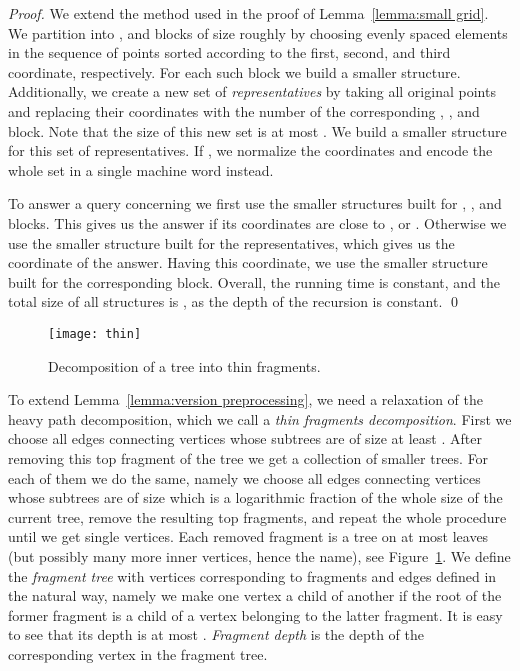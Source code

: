 \documentclass[runningheads]{llncs}
\begin{document}
\begin{proof}
We extend the method used in the proof of Lemma~\ref{lemma:small grid}. We partition  into ,  and  blocks of size roughly  by choosing  evenly spaced elements in the sequence of points sorted according to the first, second, and third coordinate, respectively. For each such block we build a smaller structure. Additionally, we create a new set of {\it representatives} by taking all original points and replacing their coordinates with the number of the corresponding , , and  block. Note that the size of this new set is at most . We build a smaller structure for this set of representatives. If , we normalize the coordinates and encode the whole set in a single machine word instead.

To answer a query concerning  we first use the smaller structures built for , , and  blocks. This gives us the answer if its coordinates are close to ,  or . Otherwise we use the smaller structure built for the representatives, which gives us the  coordinate of the answer. Having this coordinate, we use the smaller structure built for the corresponding  block. Overall, the running time is constant, and the total size of all structures is , as the depth of the recursion is constant.
\qed
\end{proof}

\begin{figure}
\centering
\texttt{[image: thin]}
\caption{Decomposition of a tree into thin fragments.}
\label{figure:thin fragments}
\end{figure}

To extend Lemma~\ref{lemma:version preprocessing}, we need a relaxation of the heavy path decomposition, which we call a {\it thin fragments decomposition}.  First we choose all edges connecting vertices whose subtrees are of size at least . After removing this top fragment
of the tree we get a collection of smaller trees. For each of them we do the same, namely we choose all edges connecting vertices whose subtrees are of size which is a logarithmic fraction of the whole size of the current tree, remove the resulting top fragments, and repeat the whole procedure until we get single vertices. Each removed fragment is a tree on at most  leaves (but possibly many more inner vertices, hence the name), see Figure~\ref{figure:thin fragments}. We define the {\it fragment tree} with vertices corresponding to fragments and edges defined in the natural way, namely we make one vertex a child of another if the root of the former fragment is a child of a vertex belonging to the latter fragment. It is easy to see that its depth is at most . {\it Fragment depth} is the depth of the corresponding vertex in the fragment tree.
\end{document}
